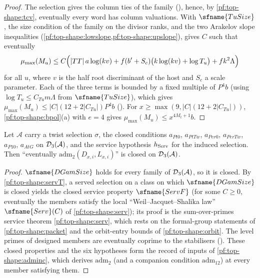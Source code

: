 \begin{proof}
The selection gives the column ties of the family
(), hence, by \cref{pf:top-shape:tcv}, eventually every word
has column valuations. With $\sfname{TuSize}$, the size condition of the family on the divisor ranks, and the two
Arakelov slope inequalities (\cref{pf:top-shape:lowslope,pf:top-shape:upslope}),
 gives $C$ such that eventually
\[
\mu_{\max}(M_u)\le C\Bigl(|TT|\,a\log(kv)+f(b'+S_c)\bigl(k\log(kv)+\log T_u\bigr)+fk^2\Lambda\Bigr)
\]
for all $u$, where $v$ is the half root discriminant of the host and $S_c$ a scale parameter. Each of the three terms
is bounded by a fixed multiple of $P^4b$ (using $\log T_u\le C_{Tu}m\Lambda$ from $\sfname{TuSize}$), which gives
$\mu_{\max}(M_u)\le|C|(12+2|C_{Tu}|)P^4b$ (). For
$x\ge\max(9,|C|(12+2|C_{Tu}|))$, \cref{pf:top-shape:bpol}(a) with $e=4$ gives $\mu_{\max}(M_u)\le x^{4M_t+1}b$.
\end{proof}

\begin{proposition}\label{pf:top-shape:adm2}
Let $\mathcal A$ carry a twist selection $\sigma$, the closed conditions $a_{Pt0}$, $a_{PtTw}$, $a_{Per0}$, $a_{PerTw}$,
$a_{P10}$, $a_{AtG}$ on $\mathcal{D}_3(\mathcal A)$, and the service hypothesis $h_{\rm Serv}$ for the induced selection.
Then ``eventually $\mathrm{adm}_2(D_{x,i},L_{x,i})$'' is closed on $\mathcal{D}_3(\mathcal A)$.
\end{proposition}

\begin{proof}
$\sfname{DGamSize}$ holds for every family of $\mathcal{D}_3(\mathcal A)$, so it is closed. By
\cref{pf:top-shape:servT}, a served selection on a class on which $\sfname{DGamSize}$ is closed yields the closed
service property $\sfname{ServF}$ (for some $C\ge0$, eventually the members satisfy the local
``Weil--Jacquet--Shalika law'' $\sfname{Serv}(C)$ of \cref{pf:top-shape:serv}); its proof is the sum-over-primes
service theorem \cref{pf:top-shape:serv}, which rests on the formal-group statements of \cref{pf:top-shape:packet}
and the orbit-entry bounds of \cref{pf:top-shape:orbit}. The level primes of designed
members are eventually coprime to the stabilisers
(). These closed properties and the
six hypotheses form the record of inputs of \cref{pf:top-shape:adminc}, which derives $\mathrm{adm}_2$ (and a
companion condition $\mathrm{adm}_{12}$) at every member satisfying them.
\end{proof}

